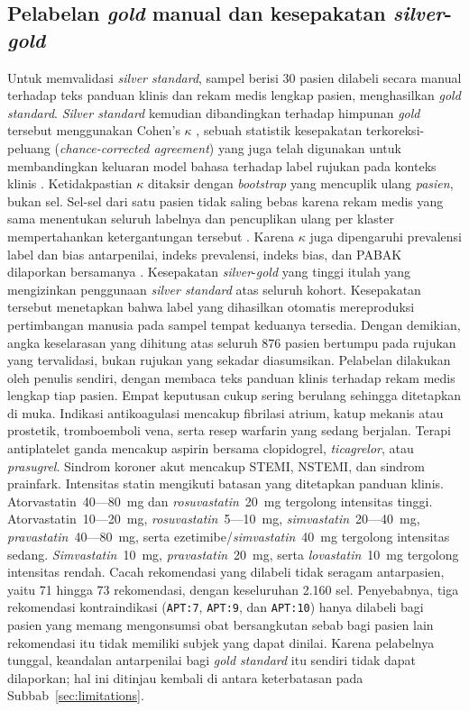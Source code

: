 \subsection{Pelabelan \emph{gold} manual dan kesepakatan \emph{silver}-\emph{gold}}
\label{sec:goldlabel}
Untuk memvalidasi \emph{silver standard}, sampel berisi 30 pasien dilabeli secara
manual terhadap teks panduan klinis dan rekam medis lengkap pasien, menghasilkan \emph{gold
standard}. \emph{Silver standard} kemudian dibandingkan terhadap himpunan \emph{gold} tersebut
menggunakan Cohen's $\kappa$ \cite{cohen1960}, sebuah statistik kesepakatan terkoreksi-peluang (\emph{chance-corrected agreement})
yang juga telah digunakan untuk membandingkan keluaran model bahasa terhadap label rujukan
pada konteks klinis \cite{shah2024}. Ketidakpastian $\kappa$ ditaksir dengan \emph{bootstrap}
\cite{efron1994} yang mencuplik ulang \emph{pasien}, bukan sel. Sel-sel dari satu pasien tidak
saling bebas karena rekam medis yang sama menentukan seluruh labelnya dan pencuplikan ulang
per klaster mempertahankan ketergantungan tersebut \cite{field2007}. Karena $\kappa$ juga
dipengaruhi prevalensi label dan bias antarpenilai, indeks prevalensi, indeks bias, dan PABAK
dilaporkan bersamanya \cite{byrt1993}. Kesepakatan \emph{silver}-\emph{gold} yang tinggi itulah
yang mengizinkan penggunaan \emph{silver standard} atas seluruh kohort. Kesepakatan tersebut
menetapkan bahwa label yang dihasilkan otomatis mereproduksi pertimbangan manusia pada sampel
tempat keduanya tersedia. Dengan demikian, angka keselarasan yang dihitung atas seluruh
876 pasien bertumpu pada rujukan yang tervalidasi, bukan rujukan yang
sekadar diasumsikan.
Pelabelan dilakukan oleh penulis sendiri, dengan membaca teks panduan klinis terhadap rekam
medis lengkap tiap pasien. Empat keputusan cukup sering berulang sehingga ditetapkan di
muka. Indikasi antikoagulasi mencakup fibrilasi atrium, katup mekanis atau prostetik,
tromboemboli vena, serta resep warfarin yang sedang berjalan. Terapi antiplatelet ganda
mencakup aspirin bersama clopidogrel, \emph{ticagrelor}, atau \emph{prasugrel}. Sindrom koroner akut
mencakup STEMI, NSTEMI, dan sindrom prainfark. Intensitas statin mengikuti batasan yang ditetapkan panduan klinis. Atorvastatin~40---80~mg
dan \emph{rosuvastatin}~20~mg tergolong intensitas tinggi. Atorvastatin~10---20~mg,
\emph{rosuvastatin}~5---10~mg, \emph{simvastatin}~20---40~mg, \emph{pravastatin}~40---80~mg, serta
ezetimibe/\emph{simvastatin}~40~mg tergolong intensitas sedang. \emph{Simvastatin}~10~mg,
\emph{pravastatin}~20~mg, serta \emph{lovastatin}~10~mg tergolong intensitas rendah. Cacah rekomendasi yang dilabeli tidak seragam antarpasien, yaitu 71 hingga
73 rekomendasi, dengan keseluruhan 2.160 sel. Penyebabnya, tiga rekomendasi kontraindikasi
(\texttt{APT:7}, \texttt{APT:9}, dan \texttt{APT:10}) hanya dilabeli bagi pasien yang
memang mengonsumsi obat bersangkutan sebab bagi pasien lain rekomendasi itu tidak
memiliki subjek yang dapat dinilai. Karena
pelabelnya tunggal, keandalan antarpenilai bagi \emph{gold standard} itu sendiri tidak
dapat dilaporkan; hal ini ditinjau kembali di antara keterbatasan pada
Subbab~\ref{sec:limitations}.

